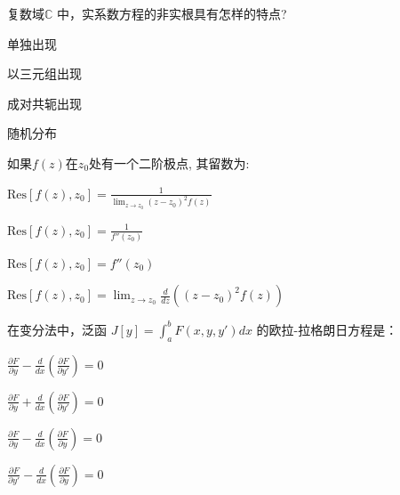 \documentclass{njustexam}
\begin{document}
  



\begin{problem}
复数域$\mathbb{C}$ 中，实系数方程的非实根具有怎样的特点?

  \begin{abcd}
    \item 单独出现
    \item 以三元组出现
    \item 成对共轭出现
    \item 随机分布
  \end{abcd}
\end{problem}


\begin{problem}
  如果$f(z)$在$z_0$处有一个二阶极点, 其留数为:
  \begin{abcd}
  \item $\text{Res}[f(z),  z_0] = \frac{1}{\lim_{z \to z_0} (z - z_0)^2 f(z)}$
  \item $\text{Res}[f(z),  z_0] = \frac{1}{f''(z_0)}$
  \item $\text{Res}[f(z),  z_0] = f''(z_0)$
  \item $\text{Res}[f(z),  z_0] = \lim_{z \to z_0} \frac{d}{dz} \left( (z - z_0)^2 f(z) \right)$
  \end{abcd}
  \end{problem}







\begin{problem}
  在变分法中，泛函 $J[y] = \int_{a}^{b} F(x, y, y') dx$ 的欧拉-拉格朗日方程是：
  \begin{abcd}
  \item $\frac{\partial F}{\partial y} - \frac{d}{dx} \left( \frac{\partial F}{\partial y'} \right) = 0$
  \item $\frac{\partial F}{\partial y} + \frac{d}{dx} \left( \frac{\partial F}{\partial y'} \right) = 0$
  \item $\frac{\partial F}{\partial y} - \frac{d}{dx} \left( \frac{\partial F}{\partial y} \right) = 0$
  \item $\frac{\partial F}{\partial y'} - \frac{d}{dx} \left( \frac{\partial F}{\partial y} \right) = 0$
  \end{abcd}
  \end{problem}
\end{document}
